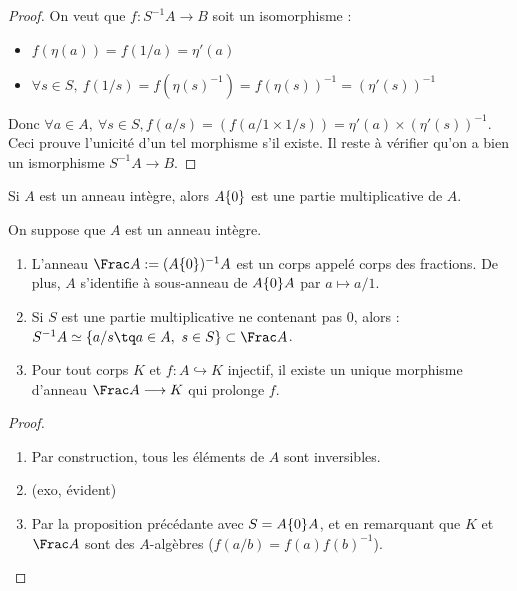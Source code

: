 \begin{proof}
On veut que $f : S^{-1}A \longrightarrow B$ soit un isomorphisme :
\begin{itemize}
 \item $f(\eta(a)) = f(1/a) = \eta'(a)$
 \item $\forall s \in S,\ f(1/s) = f(\eta(s)^{-1}) = f(\eta(s))^{-1} =
(\eta'(s))^{-1}$
\end{itemize}
Donc $\forall a\in A,\ \forall s \in S, f(a/s) = (f(a/1\times 1/s)) =
\eta'(a)\times(\eta'(s))^{-1}$. Ceci prouve l'unicité d'un tel morphisme s'il
existe. Il reste à vérifier qu'on a bien un ismorphisme $S^{-1}A \longrightarrow
B$.
\end{proof}

\begin{example}[Remarque]
 Si $A$ est un anneau intègre, alors $A\-\{0\}$ est une partie
multiplicative de $A$.
\end{example}

\begin{defiprop}

On suppose que $A$ est un anneau intègre.
\begin{enumerate}
 \item L'anneau $\Frac A := (A\-\{0\})^{-1}A$ est un corps appelé
corps des fractions. De plus, $A$ s'identifie à sous-anneau de
$A\-\{0\}A$ par $a \mapsto a/1$.
 \item Si $S$ est une partie multiplicative ne contenant pas $0$, alors :\\
$S^{-1}A \simeq \{a/s \tq a\in A,\ s\in S\} \subset \Frac A$.
 \item Pour tout corps $K$ et $f : A  \hookrightarrow K$ injectif, il existe un
unique morphisme d'anneau $\Frac A \longrightarrow K$ qui prolonge $f$.
\end{enumerate}
\end{defiprop}

\begin{proof}\

 \begin{enumerate}
  \item Par construction, tous les éléments de $A$ sont inversibles.
  \item (exo, évident)
  \item Par la proposition précédante avec $S = A\-\{0\}A$, et en
remarquant que $K$ et $\Frac A$ sont des $A$-algèbres ($f(a/b) =
f(a)f(b)^{-1}$).
 \end{enumerate}
\end{proof}

